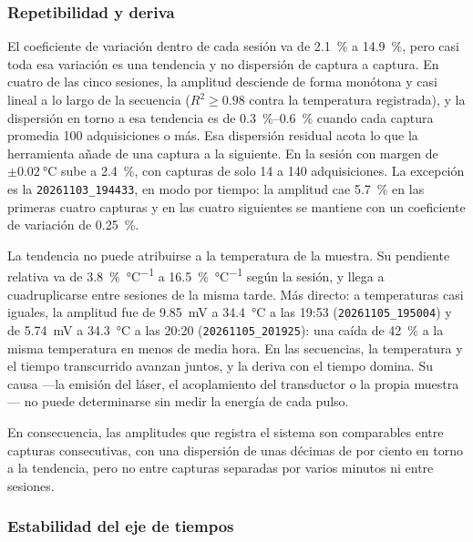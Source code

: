 \subsubsection{Repetibilidad y deriva}
\label{sec:repetibilidad}

El coeficiente de variación dentro de cada sesión va de
\SI{2.1}{\percent} a \SI{14.9}{\percent}, pero casi toda esa variación
es una tendencia y no dispersión de captura a captura. En cuatro de las
cinco sesiones, la amplitud desciende de forma monótona y casi lineal a
lo largo de la secuencia ($R^2 \geq 0.98$ contra la temperatura
registrada), y la dispersión en torno a esa tendencia es de
\SIrange{0.3}{0.6}{\percent} cuando cada captura promedia 100
adquisiciones o más. Esa dispersión residual acota lo que la
herramienta añade de una captura a la siguiente. En la sesión con
margen de $\pm\SI{0.02}{\celsius}$ sube a \SI{2.4}{\percent}, con
capturas de solo 14 a 140 adquisiciones. La excepción es la
\texttt{20261103\_194433}, en modo por tiempo: la amplitud cae
\SI{5.7}{\percent} en las primeras cuatro capturas y en las cuatro
siguientes se mantiene con un coeficiente de variación de
\SI{0.25}{\percent}.

La tendencia no puede atribuirse a la temperatura de la muestra. Su
pendiente relativa va de \SI{3.8}{\percent\per\celsius} a
\SI{16.5}{\percent\per\celsius} según la sesión, y llega a cuadruplicarse
entre sesiones de la misma tarde. Más directo:
a temperaturas casi iguales, la amplitud fue de \SI{9.85}{\milli\volt}
a \SI{34.4}{\celsius} a las 19:53 (\texttt{20261105\_195004}) y de
\SI{5.74}{\milli\volt} a \SI{34.3}{\celsius} a las 20:20
(\texttt{20261105\_201925}): una caída de \SI{42}{\percent} a la misma
temperatura en menos de media hora. En las
secuencias, la temperatura y el tiempo transcurrido avanzan juntos, y
la deriva con el tiempo domina. Su causa ---la emisión del láser, el
acoplamiento del transductor o la propia muestra--- no puede
determinarse sin medir la energía de cada pulso.

En consecuencia, las amplitudes que registra el sistema son comparables
entre capturas consecutivas, con una dispersión de unas décimas de por
ciento en torno a la tendencia, pero no entre capturas separadas por
varios minutos ni entre sesiones.

\subsubsection{Estabilidad del eje de tiempos}

